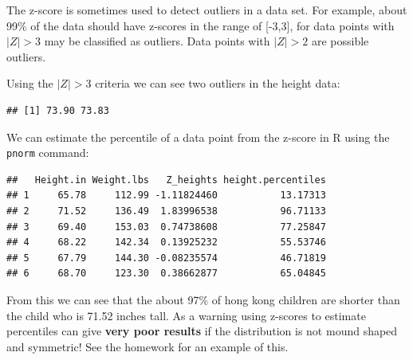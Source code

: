 \documentclass[
]{book}
\newenvironment{Shaded}{\begin{snugshade}}{\end{snugshade}}
\newcommand{\DecValTok}[1]{\textcolor[rgb]{0.00,0.00,0.81}{#1}}
\newcommand{\FunctionTok}[1]{\textcolor[rgb]{0.00,0.00,0.00}{#1}}
\newcommand{\NormalTok}[1]{#1}
\newcommand{\OtherTok}[1]{\textcolor[rgb]{0.56,0.35,0.01}{#1}}
\newcommand{\SpecialCharTok}[1]{\textcolor[rgb]{0.00,0.00,0.00}{#1}}
\theoremstyle{definition}
\theoremstyle{definition}
\theoremstyle{definition}
\theoremstyle{definition}
\theoremstyle{remark}
\begin{document}
The z-score is sometimes used to detect outliers in a data set. For example, about 99\% of the data should have z-scores in the range of {[}-3,3{]}, for data points with \(|Z|>3\) may be classified as outliers. Data points with \(|Z|>2\) are possible outliers.

Using the \(|Z|>3\) criteria we can see two outliers in the height data:

\begin{Shaded}
\end{Shaded}

\begin{verbatim}
## [1] 73.90 73.83
\end{verbatim}

We can estimate the percentile of a data point from the z-score in R using the \texttt{pnorm} command:

\begin{Shaded}
\end{Shaded}

\begin{verbatim}
##   Height.in Weight.lbs   Z_heights height.percentiles
## 1     65.78     112.99 -1.11824460           13.17313
## 2     71.52     136.49  1.83996538           96.71133
## 3     69.40     153.03  0.74738608           77.25847
## 4     68.22     142.34  0.13925232           55.53746
## 5     67.79     144.30 -0.08235574           46.71819
## 6     68.70     123.30  0.38662877           65.04845
\end{verbatim}

From this we can see that the about 97\% of hong kong children are shorter than the child who is 71.52 inches tall. As a warning using z-scores to estimate percentiles can give \textbf{very poor results} if the distribution is not mound shaped and symmetric! See the homework for an example of this.
\end{document}
